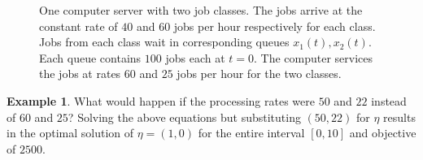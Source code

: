 \documentclass[11pt,a4paper,titlepage]{article}
\theoremstyle{definition}
\newtheorem{example}{Example}
\begin{document}
{    \begin{figure}
        \centering
        \caption[One computer with two job classes.]{
            \label{fig:one-computer-two-classes-concrete}
            One computer server with two job classes.
            The jobs arrive at the constant rate of $40$ and $60$ jobs per hour respectively for each class.
            Jobs from each class wait in corresponding queues
            $x_1(t), x_2(t)$.
            Each queue contains $100$ jobs each at $t=0$.
            The computer services the jobs at rates
            $60$ and $25$ jobs per hour for the two classes.
        }
    \end{figure}
}

\begin{example}
    \label{ex:one-computer-two-classes-concrete-perturbed}
    What would happen if the processing rates were $50$ and $22$
    instead of $60$ and $25$?
    Solving the above equations but substituting $(50,22)$ for $\eta$
    results in the optimal solution of $\eta = (1,0)$ for the entire
    interval $[0,10]$ and objective of $2500$.
\end{example}
\end{document}

